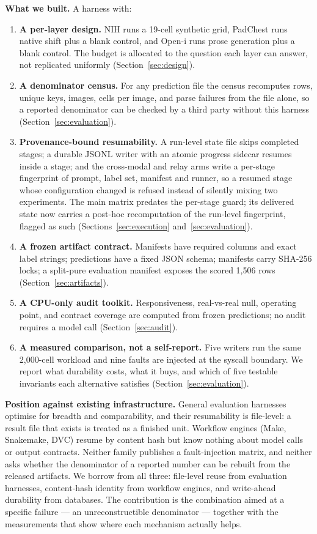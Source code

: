 \textbf{What we built.} A harness with:
\begin{enumerate}[leftmargin=1.2em,itemsep=2pt,topsep=2pt]
\item \textbf{A per-layer design.} NIH runs a 19-cell synthetic grid, PadChest runs native shift plus a blank control, and Open-i runs prose generation plus a blank control. The budget is allocated to the question each layer can answer, not replicated uniformly (Section~\ref{sec:design}).
\item \textbf{A denominator census.} For any prediction file the census recomputes rows, unique keys, images, cells per image, and parse failures from the file alone, so a reported denominator can be checked by a third party without this harness (Section~\ref{sec:evaluation}).
\item \textbf{Provenance-bound resumability.} A run-level state file skips completed stages; a durable JSONL writer with an atomic progress sidecar resumes inside a stage; and the cross-modal and relay arms write a per-stage fingerprint of prompt, label set, manifest and runner, so a resumed stage whose configuration changed is refused instead of silently mixing two experiments. The main matrix predates the per-stage guard; its delivered state now carries a post-hoc recomputation of the run-level fingerprint, flagged as such (Sections~\ref{sec:execution} and~\ref{sec:evaluation}).
\item \textbf{A frozen artifact contract.} Manifests have required columns and exact label strings; predictions have a fixed JSON schema; manifests carry SHA-256 locks; a split-pure evaluation manifest exposes the scored 1,506 rows (Section~\ref{sec:artifacts}).
\item \textbf{A CPU-only audit toolkit.} Responsiveness, real-vs-real null, operating point, and contract coverage are computed from frozen predictions; no audit requires a model call (Section~\ref{sec:audit}).
\item \textbf{A measured comparison, not a self-report.} Five writers run the same 2,000-cell workload and nine faults are injected at the syscall boundary. We report what durability costs, what it buys, and which of five testable invariants each alternative satisfies (Section~\ref{sec:evaluation}).
\end{enumerate}

\textbf{Position against existing infrastructure.} General evaluation harnesses optimise for breadth and comparability, and their resumability is file-level: a result file that exists is treated as a finished unit. Workflow engines (Make, Snakemake, DVC) resume by content hash but know nothing about model calls or output contracts. Neither family publishes a fault-injection matrix, and neither asks whether the denominator of a reported number can be rebuilt from the released artifacts. We borrow from all three: file-level reuse from evaluation harnesses, content-hash identity from workflow engines, and write-ahead durability from databases. The contribution is the combination aimed at a specific failure --- an unreconstructible denominator --- together with the measurements that show where each mechanism actually helps.

